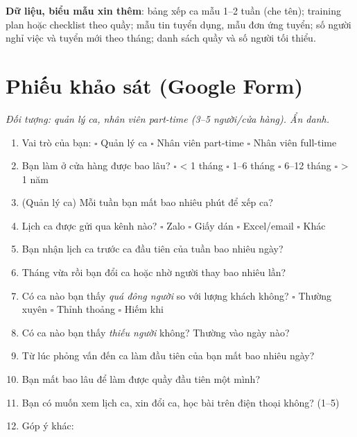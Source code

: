 \documentclass[12pt,a4paper,oneside]{report}
\begin{document}
\textbf{Dữ liệu, biểu mẫu xin thêm}: bảng xếp ca mẫu 1–2 tuần (che tên); training plan hoặc checklist theo quầy; mẫu tin tuyển dụng, mẫu đơn ứng tuyển; số người nghỉ việc và tuyển mới theo tháng; danh sách quầy và số người tối thiểu.

\chapter{Phiếu khảo sát (Google Form)}
\emph{Đối tượng: quản lý ca, nhân viên part-time (3–5 người/cửa hàng). Ẩn danh.}
\begin{enumerate}
\item Vai trò của bạn: \quad $\square$ Quản lý ca \quad $\square$ Nhân viên part-time \quad $\square$ Nhân viên full-time
\item Bạn làm ở cửa hàng được bao lâu? \quad $\square$ < 1 tháng \quad $\square$ 1–6 tháng \quad $\square$ 6–12 tháng \quad $\square$ > 1 năm
\item (Quản lý ca) Mỗi tuần bạn mất bao nhiêu phút để xếp ca? \quad \underline{\hspace{2cm}}
\item Lịch ca được gửi qua kênh nào? \quad $\square$ Zalo \quad $\square$ Giấy dán \quad $\square$ Excel/email \quad $\square$ Khác
\item Bạn nhận lịch ca trước ca đầu tiên của tuần bao nhiêu ngày? \quad \underline{\hspace{2cm}}
\item Tháng vừa rồi bạn đổi ca hoặc nhờ người thay bao nhiêu lần? \quad \underline{\hspace{2cm}}
\item Có ca nào bạn thấy \emph{quá đông người} so với lượng khách không? \quad $\square$ Thường xuyên \quad $\square$ Thỉnh thoảng \quad $\square$ Hiếm khi
\item Có ca nào bạn thấy \emph{thiếu người} không? Thường vào ngày nào? \quad \underline{\hspace{3cm}}
\item Từ lúc phỏng vấn đến ca làm đầu tiên của bạn mất bao nhiêu ngày? \quad \underline{\hspace{2cm}}
\item Bạn mất bao lâu để làm được quầy đầu tiên một mình? \quad \underline{\hspace{2cm}}
\item Bạn có muốn xem lịch ca, xin đổi ca, học bài trên điện thoại không? (1–5)
\item Góp ý khác: \underline{\hspace{8cm}}
\end{enumerate}
\end{document}
